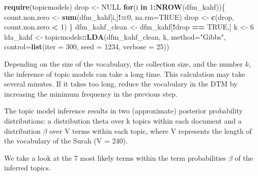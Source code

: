 \documentclass[
]{article}
\newenvironment{Shaded}{\begin{snugshade}}{\end{snugshade}}
\newcommand{\AttributeTok}[1]{\textcolor[rgb]{0.13,0.29,0.53}{#1}}
\newcommand{\ConstantTok}[1]{\textcolor[rgb]{0.56,0.35,0.01}{#1}}
\newcommand{\ControlFlowTok}[1]{\textcolor[rgb]{0.13,0.29,0.53}{\textbf{#1}}}
\newcommand{\DecValTok}[1]{\textcolor[rgb]{0.00,0.00,0.81}{#1}}
\newcommand{\FunctionTok}[1]{\textcolor[rgb]{0.13,0.29,0.53}{\textbf{#1}}}
\newcommand{\NormalTok}[1]{#1}
\newcommand{\OtherTok}[1]{\textcolor[rgb]{0.56,0.35,0.01}{#1}}
\newcommand{\SpecialCharTok}[1]{\textcolor[rgb]{0.81,0.36,0.00}{\textbf{#1}}}
\newcommand{\StringTok}[1]{\textcolor[rgb]{0.31,0.60,0.02}{#1}}
\begin{document}
\footnotesize

\begin{Shaded}
\begin{Highlighting}[]
\FunctionTok{require}\NormalTok{(topicmodels)}
\NormalTok{drop }\OtherTok{\textless{}{-}} \ConstantTok{NULL}
\ControlFlowTok{for}\NormalTok{(i }\ControlFlowTok{in} \DecValTok{1}\SpecialCharTok{:}\FunctionTok{NROW}\NormalTok{(dfm\_kahf))\{}
\NormalTok{     count.non.zero }\OtherTok{\textless{}{-}} \FunctionTok{sum}\NormalTok{(dfm\_kahf[i,]}\SpecialCharTok{!=}\DecValTok{0}\NormalTok{, }\AttributeTok{na.rm=}\ConstantTok{TRUE}\NormalTok{)}
\NormalTok{     drop }\OtherTok{\textless{}{-}} \FunctionTok{c}\NormalTok{(drop, count.non.zero }\SpecialCharTok{\textless{}} \DecValTok{1}\NormalTok{)}
\NormalTok{   \}}
\NormalTok{dfm\_kahf\_clean }\OtherTok{\textless{}{-}}\NormalTok{ dfm\_kahf[}\SpecialCharTok{!}\NormalTok{drop }\SpecialCharTok{==} \ConstantTok{TRUE}\NormalTok{,]}
\NormalTok{k }\OtherTok{\textless{}{-}} \DecValTok{6}
\NormalTok{lda\_kahf }\OtherTok{\textless{}{-}}\NormalTok{ topicmodels}\SpecialCharTok{::}\FunctionTok{LDA}\NormalTok{(dfm\_kahf\_clean, k, }\AttributeTok{method=}\StringTok{"Gibbs"}\NormalTok{, }
            \AttributeTok{control=}\FunctionTok{list}\NormalTok{(}\AttributeTok{iter =} \DecValTok{300}\NormalTok{, }\AttributeTok{seed =} \DecValTok{1234}\NormalTok{, }\AttributeTok{verbose =} \DecValTok{25}\NormalTok{))}
\end{Highlighting}
\end{Shaded}

\normalsize

Depending on the size of the vocabulary, the collection size, and the number \(k\), the inference of topic models can take a long time. This calculation may take several minutes. If it takes too long, reduce the vocabulary in the DTM by increasing the minimum frequency in the previous step.

The topic model inference results in two (approximate) posterior probability distributions: a distribution theta over k topics within each document and a distribution \(\beta\) over V terms within each topic, where V represents the length of the vocabulary of the Surah (V = 240).

We take a look at the 7 most likely terms within the term probabilities \(\beta\) of the inferred topics.
\end{document}
